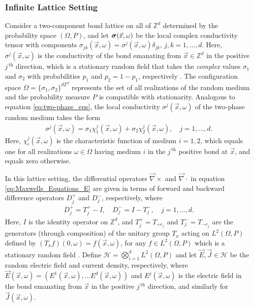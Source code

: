 \documentclass{cmslatex}
\newcommand\bsig{\mbox{\boldmath${\sigma}$}}
\begin{document}
\subsubsection{Infinite Lattice Setting}
\label{sec:Infinite_Lattice_Setting}
%
Consider a two-component bond lattice on all of $\mathbb{Z}^d$
determined by the probability space $(\Omega,P)$, and let
$\bsig(\vec{x},\omega)$ be the local complex conductivity tensor with
components $\sigma_{jk}(\vec{x},\omega)=\sigma^j(\vec{x},\omega)\delta_{jk}$, $j,k=1,\ldots,d$. Here,
$\sigma^j(\vec{x},\omega)$ is the conductivity of the bond emanating from 
$\vec{x}\in\mathbb{Z}^d$ in the positive $j^{\,\text{th}}$ direction, 
which is a stationary random field that takes the \emph{complex} values
$\sigma_1$ and $\sigma_2$ with probabilities $p_1$ and $p_2=1-p_1$,
respectively \cite{Golden:CMP-467,Bruno:JSP-365}. The configuration
space $\Omega=\{\sigma_1,\sigma_2\}^{d\mathbb{Z}^d}$ represents the set of all
realizations of the random medium and the 
probability measure $P$ is compatible with stationarity. Analogous to equation
\eqref{eq:two-phase_eps}, the local conductivity $\sigma^j(\vec{x},\omega)$ of
the two-phase random medium takes the form \cite{Golden:CMP-467}
%
\begin{align}\label{eq:two-phase_sigma}
  \sigma^j(\vec{x},\omega)=\sigma_1\chi_1^j(\vec{x},\omega)+\sigma_2\chi_2^j(\vec{x},\omega), \quad j=1,\ldots,d.
\end{align}
%
Here, $\chi_i^j(\vec{x},\omega)$ is the characteristic function of medium
$i=1,2$, which equals one for all realizations $\omega\in\Omega$ having medium $i$
in the $j^{\,\text{th}}$ positive bond at $\vec{x}$, and equals zero
otherwise.




In this lattice setting, the differential operators $\vec{\nabla}\times$ and
$\vec{\nabla}\cdot$ in equation \eqref{eq:Maxwells_Equations_E} are given 
\cite{Golden:CMP-467,Bruno:JSP-365} in terms of forward and backward
difference operators $D_j^+$ and $D_j^-$, respectively, where
%
\begin{align}\label{eq:Difference_Operators}
  D_j^+=T_j^+-I, \quad D_j^-=I-T_j^-, \quad j=1,\ldots,d.
\end{align}
%
Here, $I$ is the identity operator on $\mathbb{Z}^d$, and 
$T_j^+=T_{+e_j}$ and $T_j^-=T_{-e_j}$ are the generators (through 
composition) of the unitary group $T_x$ acting on $L^2(\Omega,P)$ defined
by $(T_xf)(0,\omega)=f(\vec{x},\omega)$, for any $f\in L^2(\Omega,P)$
which is a stationary random field
\cite{Golden:CMP-467}. Define $\mathscr{H}=\bigotimes_{i=1}^dL^2(\Omega,P)$ and let
$\vec{E},\vec{J}\in \mathscr{H}$ be  
the random electric field and current density,
respectively, where $\vec{E}(\vec{x},\omega)=(E^1(\vec{x},\omega),\ldots
E^d(\vec{x},\omega))$ and $E^j(\vec{x},\omega)$ is the electric field in the
bond emanating from $\vec{x}$ in the positive $j^{\,\text{th}}$
direction, and similarly for $\vec{J}(\vec{x},\omega)$. 
\end{document}
